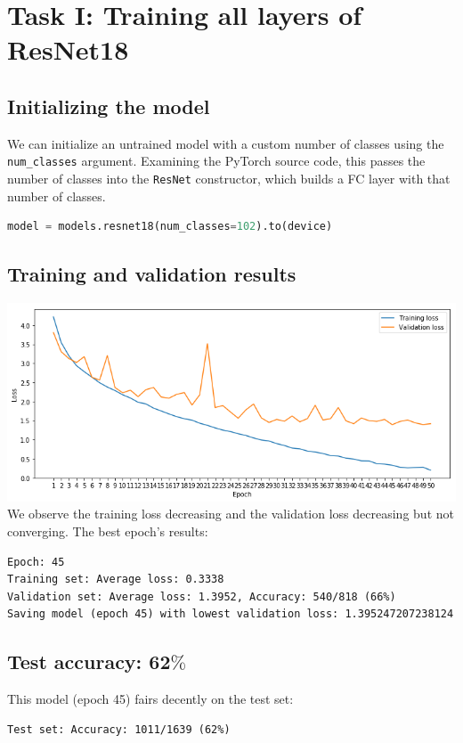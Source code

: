 \documentclass[twocolumn,9pt]{article}
\begin{document}
\section{Task I: Training all layers of ResNet18}
\subsection*{Initializing the model}
We can initialize an untrained model with a custom number of classes using the \lstinline{num_classes}
argument. Examining the PyTorch source code, this passes the number of classes into the \lstinline{ResNet}
constructor, which builds a FC layer with that number of classes.
\begin{lstlisting}[language=Python]
model = models.resnet18(num_classes=102).to(device)
\end{lstlisting}

\subsection*{Training and validation results}
\includegraphics[width=\columnwidth]{task1.png}
We observe the training loss decreasing and the validation loss decreasing but not converging. The best
epoch's results:
\begin{lstlisting}
Epoch: 45
Training set: Average loss: 0.3338
Validation set: Average loss: 1.3952, Accuracy: 540/818 (66%)
Saving model (epoch 45) with lowest validation loss: 1.395247207238124
\end{lstlisting}

\subsection*{Test accuracy: 62$\%$}
This model (epoch 45) fairs decently on the test set:
\begin{lstlisting}
Test set: Accuracy: 1011/1639 (62%)
\end{lstlisting}
\end{document}
